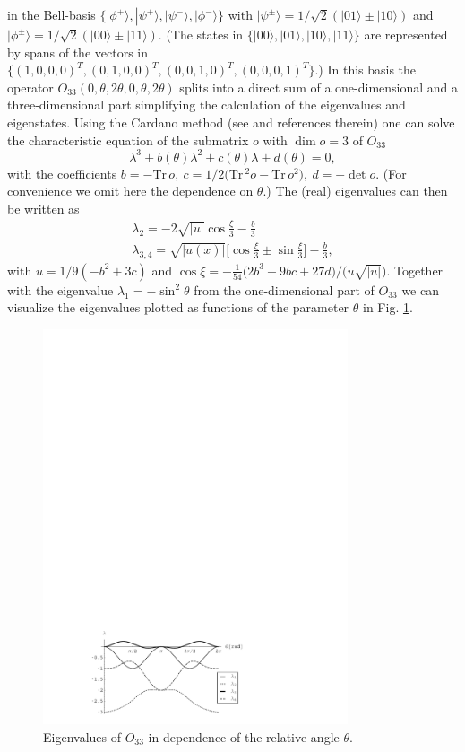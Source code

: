 \documentclass[prl,showpacs,showkeys,amsfonts,amsmath,twocolumn]{revtex4}
\newcommand{\ket}[1]{|#1\rangle}
\newcommand{\Tr}{\text{Tr}\,}
\begin{document}
in the Bell-basis
$\{\ket{\phi^+},\ket{\psi^+},\ket{\psi^-},\ket{\phi^-}\}$ with
$\ket{\psi^\pm} = 1/\sqrt{2}(\ket{01} \pm \ket{10})$ and
$\ket{\phi^\pm} = 1/\sqrt{2}(\ket{00} \pm \ket{11})$.
(The states in
$\{\ket{00},\ket{01},\ket{10},\ket{11}\}$ are represented by spans of the vectors in
$\{(1,0,0,0)^T,(0,1,0,0)^T,(0,0,1,0)^T,(0,0,0,1)^T\}$.)
In this basis
the operator $O_{33}(0,\theta,2\theta,0,\theta,2\theta)$ splits into a direct sum of a one-dimensional
and a three-dimensional part simplifying the calculation of the
eigenvalues and eigenstates. Using the Cardano method
(see \cite{cocolicchio00} and references therein) one can
solve the characteristic equation of the submatrix $o$ with $\dim o
=3$ of $O_{33}$
\begin{equation}
  \lambda^3 + b(\theta) \lambda^2 + c(\theta) \lambda + d(\theta) = 0,
\label{2004-qbounds-characteristic}
\end{equation}
with the coefficients $b = -\Tr o,\ c = 1/2\Big(\Tr^2 o -
\Tr o^2 \Big),\ d = -\det o$. (For convenience we omit here the
dependence on $\theta$.) The (real) eigenvalues can then be written as \cite{cocolicchio00}
\begin{eqnarray}
\lambda_2 = -2 \sqrt{|u|}\cos\frac{\xi}{3}-\frac{b}{3}\nonumber\\
\lambda_{3,4} = \sqrt{|u(x)|}\Big[\cos\frac{\xi}{3} \pm
\sin\frac{\xi}{3}\Big]-\frac{b}{3},
\label{2004-qbounds-o33ev}
\end{eqnarray}
with $u=1/9(-b^2+3 c)$ and $\cos\xi = - \frac{1}{54}\big(2
b^3-9 b c + 27 d\big)/\big(u\sqrt{|u|}\big)$.
Together with the eigenvalue $\lambda_1 = -\sin^2\theta$ from the
one-dimensional part of $O_{33}$ we can visualize the eigenvalues plotted as functions of
the parameter $\theta$ in Fig. \ref{fig:2004-qbounds-f1}.
\begin{figure}[htbp]
  \centering
  \includegraphics[width=90mm]{2004-qbounds-f1}
  \caption{Eigenvalues of $O_{33}$ in dependence of the relative angle $\theta$.}
  \label{fig:2004-qbounds-f1}
\end{figure}
\end{document}
